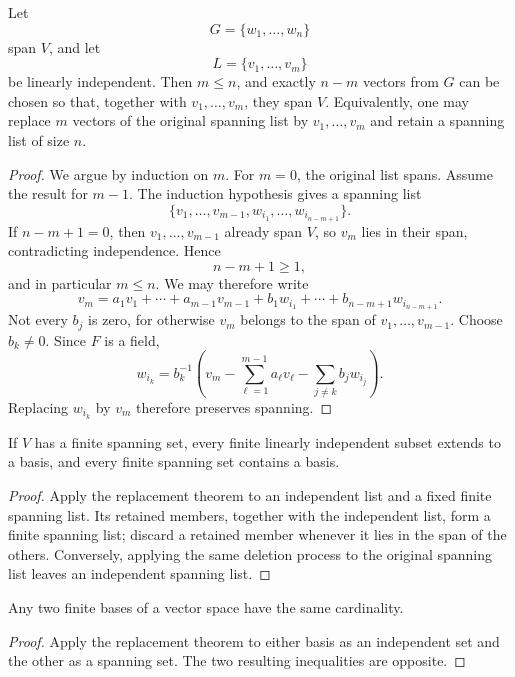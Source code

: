 \begin{theorem}
Let
\[
G=\{w_1,\ldots,w_n\}
\]
span \(V\), and let
\[
L=\{v_1,\ldots,v_m\}
\]
be linearly independent. Then \(m\leq n\), and exactly \(n-m\) vectors from
\(G\) can be chosen so that, together with \(v_1,\ldots,v_m\), they span
\(V\). Equivalently, one may replace \(m\) vectors of the original spanning
list by \(v_1,\ldots,v_m\) and retain a spanning list of size \(n\).
\end{theorem}
\begin{proof}
We argue by induction on \(m\). For \(m=0\), the original list spans. Assume
the result for \(m-1\). The induction hypothesis gives a spanning list
\[
\{v_1,\ldots,v_{m-1},w_{i_1},\ldots,w_{i_{n-m+1}}\}.
\]
If \(n-m+1=0\), then \(v_1,\ldots,v_{m-1}\) already span \(V\), so
\(v_m\) lies in their span, contradicting independence. Hence
\[
n-m+1\geq1,
\]
and in particular \(m\leq n\). We may therefore write
\[
v_m=a_1v_1+\cdots+a_{m-1}v_{m-1}
+b_1w_{i_1}+\cdots+b_{n-m+1}w_{i_{n-m+1}}.
\]
Not every \(b_j\) is zero, for otherwise \(v_m\) belongs to the span of
\(v_1,\ldots,v_{m-1}\). Choose \(b_k\ne0\). Since \(F\) is a field,
\[
w_{i_k}
=b_k^{-1}\left(
v_m-\sum_{\ell=1}^{m-1}a_\ell v_\ell
-\sum_{j\ne k}b_jw_{i_j}
\right).
\]
Replacing \(w_{i_k}\) by \(v_m\) therefore preserves spanning.
\end{proof}

\begin{corollary}
If \(V\) has a finite spanning set, every finite linearly independent subset
extends to a basis, and every finite spanning set contains a basis.
\end{corollary}
\begin{proof}
Apply the replacement theorem to an independent list and a fixed finite
spanning list. Its retained members, together with the independent list, form
a finite spanning list; discard a retained member whenever it lies in the
span of the others. Conversely, applying the same deletion process to the
original spanning list leaves an independent spanning list.
\end{proof}

\begin{corollary}
Any two finite bases of a vector space have the same cardinality.
\end{corollary}
\begin{proof}
Apply the replacement theorem to either basis as an independent set and the
other as a spanning set. The two resulting inequalities are opposite.
\end{proof}

